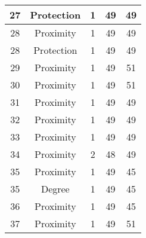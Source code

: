 \documentclass[results.tex]{subfiles}
\begin{document}
\begin{center}
\begin{tabular}{| c || c | c | c | c |}
            \hline
            27                      & Protection                   & 1                      & 49                      & 49                   \\
            \hline
            28                      & Proximity                    & 1                      & 49                      & 49                   \\
            \hline
            28                      & Protection                   & 1                      & 49                      & 49                   \\
            \hline
            29                      & Proximity                    & 1                      & 49                      & 51                   \\
            \hline
            30                      & Proximity                    & 1                      & 49                      & 51                   \\
            \hline
            31                      & Proximity                    & 1                      & 49                      & 49                   \\
            \hline
            32                      & Proximity                    & 1                      & 49                      & 49                   \\
            \hline
            33                      & Proximity                    & 1                      & 49                      & 49                   \\
            \hline
            34                      & Proximity                    & 2                      & 48                      & 49                   \\
            \hline
            35                      & Proximity                    & 1                      & 49                      & 45                   \\
            \hline
            35                      & Degree                       & 1                      & 49                      & 45                   \\
            \hline
            36                      & Proximity                    & 1                      & 49                      & 45                   \\
            \hline
            37                      & Proximity                    & 1                      & 49                      & 51                   \\

\end{tabular}
\end{center}
\end{document}
